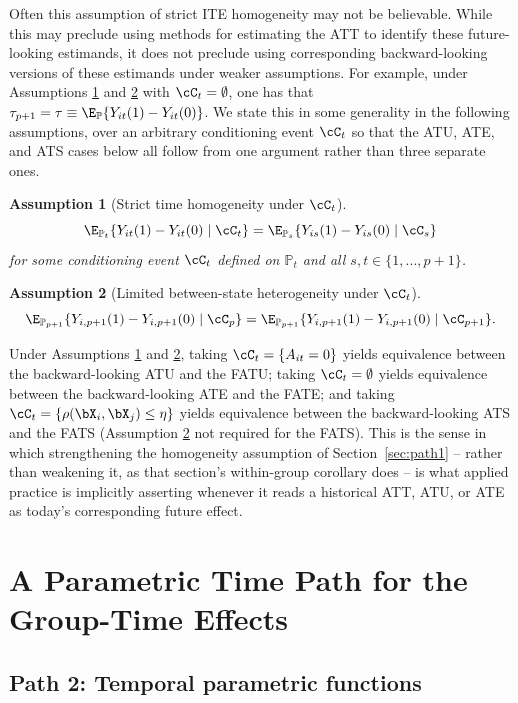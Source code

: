 \documentclass{article}
\newtheorem{assumption}{Assumption}
\renewcommand{\P}{\mathbb{P}}
\begin{document}
    Often this assumption of strict ITE homogeneity may not be believable. While this may preclude using methods for estimating the ATT to identify these future-looking estimands, it does not preclude using corresponding backward-looking versions of these estimands under weaker assumptions. For example, under Assumptions \ref{general-strict-time-homogeneity} and \ref{general-p-to-p-plus-one-heterogeneity} with $\cC_t = \emptyset$, one has that $\tau_{p+1} = \tau \equiv \E_\P\{Y_{it}(1) - Y_{it}(0)\}$. We state this in some generality in the following assumptions, over an arbitrary conditioning event $\cC_t$ so that the ATU, ATE, and ATS cases below all follow from one argument rather than three separate ones.
\begin{assumption}[Strict time homogeneity under $\cC_t$]\label{general-strict-time-homogeneity}
\[
\E_{\P_t}\{Y_{it}(1) - Y_{it}(0) \mid \cC_t\} = \E_{\P_s}\{Y_{is}(1) - Y_{is}(0) \mid \cC_s\}
\]
for some conditioning event $\cC_t$ defined on $\P_t$ and all $s, t \in \{1, ..., p+1\}$.
\end{assumption}
\begin{assumption}[Limited between-state heterogeneity under $\cC_t$]\label{general-p-to-p-plus-one-heterogeneity}
\[
\E_{\P_{p+1}}\{Y_{i,p+1}(1) - Y_{i,p+1}(0) \mid \cC_p\} = \E_{\P_{p+1}}\{Y_{i,p+1}(1) - Y_{i,p+1}(0) \mid \cC_{p+1}\}.
\]
\end{assumption}
Under Assumptions \ref{general-strict-time-homogeneity} and \ref{general-p-to-p-plus-one-heterogeneity}, taking $\cC_t = \{A_{it} = 0\}$ yields equivalence between the backward-looking ATU and the FATU; taking $\cC_t = \emptyset$ yields equivalence between the backward-looking ATE and the FATE; and taking $\cC_t = \{\rho(\bX_i, \bX_j) \leq \eta\}$ yields equivalence between the backward-looking ATS and the FATS (Assumption \ref{general-p-to-p-plus-one-heterogeneity} not required for the FATS). This is the sense in which strengthening the homogeneity assumption of Section~\ref{sec:path1} -- rather than weakening it, as that section's within-group corollary does -- is what applied practice is implicitly asserting whenever it reads a historical ATT, ATU, or ATE as today's corresponding future effect.

\section{A Parametric Time Path for the Group-Time Effects}\label{sec:parametric-time-path}
\subsection{Path 2: Temporal parametric functions}\label{sec:path2}
\end{document}
